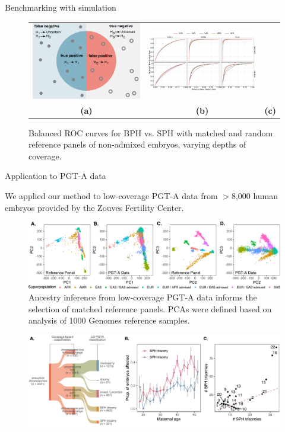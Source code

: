 \documentclass[final]{beamer}
\newlength{\colwidth}
\begin{document}
\begin{frame}[t]
\begin{columns}[t]
\begin{column}{\colwidth}
\begin{block}{Benchmarking with simulation}
\begin{figure}
\begin{tabular}{ccc}
  \includegraphics[width=0.27\linewidth,align=c]{figures/fig4b.pdf} &
 \includegraphics[width=.45\linewidth,align=c]{figures/fig4c.pdf} \\
 \textbf{(a)} & \textbf{(b)} & \textbf{(c)}
  \end{tabular}
  \caption{Balanced ROC curves for BPH vs. SPH with matched and random reference panels of non-admixed embryos, varying depths of coverage. }
 \end{figure}
\end{block}

  \begin{block}{Application to PGT-A data}
  
 We applied our method to low-coverage PGT-A data from $>$8,000 human embryos provided by the Zouves Fertility Center. 

     \begin{figure}
      \centering
     \includegraphics[width=\linewidth]{figures/fig5.pdf}
\caption{Ancestry inference from low-coverage PGT-A data informs the selection of matched reference panels. PCAs were defined based on analysis of 1000 Genomes reference samples. }
\end{figure}
\begin{figure}
     \includegraphics[width=\linewidth]{figures/fig6.pdf}


\end{figure}
\end{block}
\end{column}
\end{columns}
\end{frame}
\end{document}
